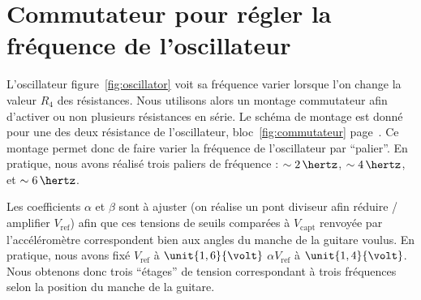 \documentclass[a4paper, 11pt, twocolumn]{article}
\begin{document}
\section{Commutateur pour régler la fréquence de l'oscillateur}

L'oscillateur figure~\ref{fig:oscillator} voit sa fréquence varier lorsque l'on change la valeur $R_4$ des résistances. Nous utilisons alors un montage commutateur afin d'activer ou non plusieurs résistances en série. Le schéma de montage est donné pour une des deux résistance de l'oscillateur, bloc~\ref{fig:commutateur} page~\pageref{fig:commutateur}. Ce montage permet donc de faire varier la fréquence de l'oscillateur par \enquote{palier}. En pratique, nous avons réalisé trois paliers de fréquence : $\sim 2\,\hertz$,  $\sim 4\,\hertz$, et  $\sim 6\,\hertz$.

Les coefficients $\alpha$ et $\beta$ sont à ajuster (on réalise un pont diviseur afin réduire / amplifier $V_\text{ref}$) afin que ces tensions de seuils comparées à $V_\text{capt}$ renvoyée par l'accéléromètre correspondent bien aux angles du manche de la guitare voulus. En pratique, nous avons fixé $V_\text{ref}$ à $\unit{1,6}{\volt}$ $\alpha V_\text{ref}$ à $\unit{1,4}{\volt}$. Nous obtenons donc trois \enquote{étages} de tension correspondant à trois fréquences selon la position du manche de la guitare.
\end{document}
